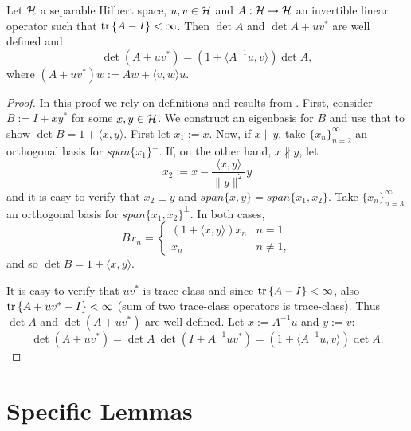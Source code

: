 \documentclass{amsart}
\numberwithin{equation}{section}
\begin{document}
\begin{lemma}\label{lemma:MDL}
  Let $\mathcal{H}$ a separable Hilbert space, $u,v\in \mathcal{H}$ and $A: \mathcal{H} \to
  \mathcal{H}$ an invertible linear operator such that $\textup{tr}\left \{A-I \right \} <
  \infty$. Then $\det A$ and $\det A + uv^*$ are well defined and
  \begin{equation*}
    \det (A + uv^*) = (1 + \langle A^{-1} u, v \rangle ) \det A,
  \end{equation*}
  where $(A + uv^*)w := Aw + \langle v,w \rangle u$.
\end{lemma}
\begin{proof}
  In this proof we rely on definitions and results from
  \cite{Simon77}. First, consider $B := I + xy^*$ for some $x,y \in
  \mathcal{H}$. We construct an eigenbasis for $B$ and use that to show $\det
  B = 1 + \langle x, y \rangle$. First let $x_1 := x$.  Now, if $x
  \parallel y$, take $\{x_n \}_{n=2}^{\infty}$ an orthogonal basis for
  $span\{x_1\} ^{\perp}$. If, on the other hand, $x \nparallel y$, let
  \begin{equation*}
    x_2 := x - \frac{ \langle x, y\rangle}{\|y\|^2}y
  \end{equation*}
  and it is easy to verify that $x_2 \perp y$ and $span \{x,y\} = span
  \{x_1,x_2\}$. Take $\{x_n \}_{n=3}^{\infty}$ an orthogonal basis for
  $span\{x_1,x_2\} ^{\perp}$. In both cases,
  \begin{equation*}
    B x_n =
    \begin{cases}
      (1 + \langle x, y \rangle) x_n & n = 1 \\
      x_n                            & n \neq 1,
    \end{cases}
  \end{equation*}
  and so $\det B = 1 + \langle x, y \rangle$.
  
  It is easy to verify that $uv^*$ is trace-class and since $\textup{tr}\left \{A-I \right \}
  < \infty$, also $\textup{tr}\left \{A + uv^* - I \right \} < \infty$ (sum of two trace-class
  operators is trace-class). Thus $\det A$ and $\det (A+uv^*)$ are
  well defined. Let $x:=A^{-1}u$ and $y := v$:
  \begin{equation*}
    \det (A + uv^*) = \det A \ \det(I+A^{-1}uv^*) =
    (1 + \langle A^{-1}u, v \rangle) \det A .
  \end{equation*}
\end{proof}





\section{Specific Lemmas}
\end{document}

